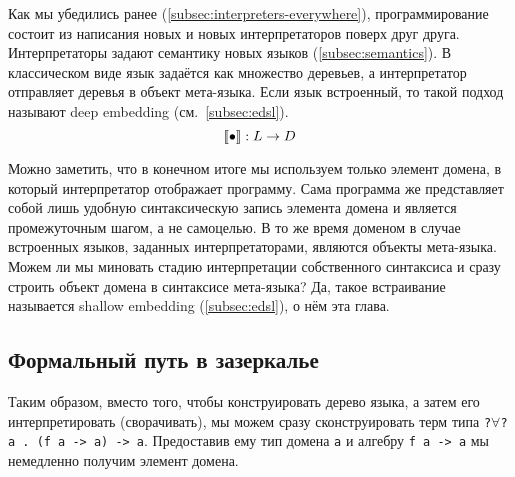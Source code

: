 
Как мы убедились ранее (\ref{subsec:interpreters-everywhere}), программирование состоит из написания новых и новых интерпретаторов поверх друг друга.
Интерпретаторы задают семантику новых языков (\ref{subsec:semantics}).
В классическом виде язык задаётся как множество деревьев, а интерпретатор отправляет деревья в объект мета-языка.
Если язык встроенный, то такой подход называют deep embedding (см.~\ref{subsec:edsl}).
\[
    \llbracket{\bullet}\rrbracket : L \to D
\]

Можно заметить, что в конечном итоге мы используем только элемент домена, в который интерпретатор отображает программу.
Сама программа же представляет собой лишь удобную синтаксическую запись элемента домена и является промежуточным шагом, а не самоцелью.
В то же время доменом в случае встроенных языков, заданных интерпретаторами, являются объекты мета-языка.
Можем ли мы миновать стадию интерпретации собственного синтаксиса и сразу строить объект домена в синтаксисе мета-языка?
Да, такое встраивание называется shallow embedding (\ref{subsec:edsl}), о нём эта глава.

\subsection{Формальный путь в зазеркалье} \label{subsec:to-wonderland}







Таким образом, вместо того, чтобы конструировать дерево языка, а затем его интерпретировать (сворачивать), мы можем сразу сконструировать терм типа \texttt{?$\forall$?a . (f a -> a) -> a}.
Предоставив ему тип домена \texttt{a} и алгебру \texttt{f a -> a} мы немедленно получим элемент домена.










